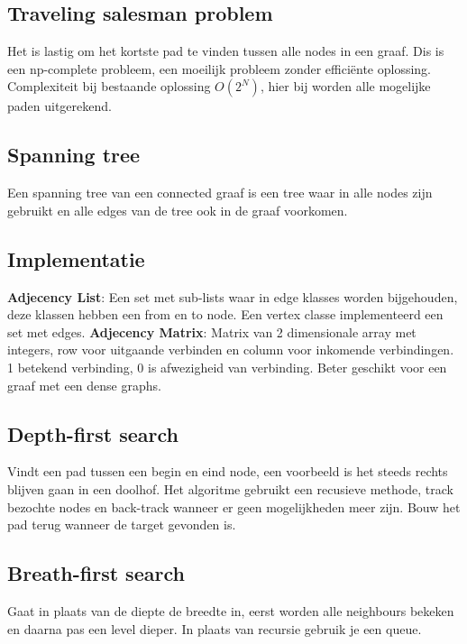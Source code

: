 \subsection{Traveling salesman problem}
Het is lastig om het kortste pad te vinden tussen alle nodes in een graaf.
Dis is een np-complete probleem, een moeilijk probleem zonder efficiënte oplossing.
Complexiteit bij bestaande oplossing $O(2^N)$, hier bij worden alle mogelijke paden uitgerekend.

\subsection{Spanning tree}
Een spanning tree van een connected graaf is een tree waar in alle nodes zijn gebruikt en alle edges van de tree ook in de graaf voorkomen.

\subsection{Implementatie}
\textbf{Adjecency List}: Een set met sub-lists waar in edge klasses worden bijgehouden, deze klassen hebben een from en to node.
Een vertex classe implementeerd een set met edges.
\textbf{Adjecency Matrix}: Matrix van 2 dimensionale array met integers, row voor uitgaande verbinden en column voor inkomende verbindingen.
1 betekend verbinding, 0 is afwezigheid van verbinding.
Beter geschikt voor een graaf met een dense graphs.

\subsection{Depth-first search}
Vindt een pad tussen een begin en eind node, een voorbeeld is het steeds rechts blijven gaan in een doolhof.
Het algoritme gebruikt een recusieve methode, track bezochte nodes en back-track wanneer er geen mogelijkheden meer zijn.
Bouw het pad terug wanneer de target gevonden is.

\subsection{Breath-first search}
Gaat in plaats van de diepte de breedte in, eerst worden alle neighbours bekeken en daarna pas een level dieper.
In plaats van recursie gebruik je een queue.
